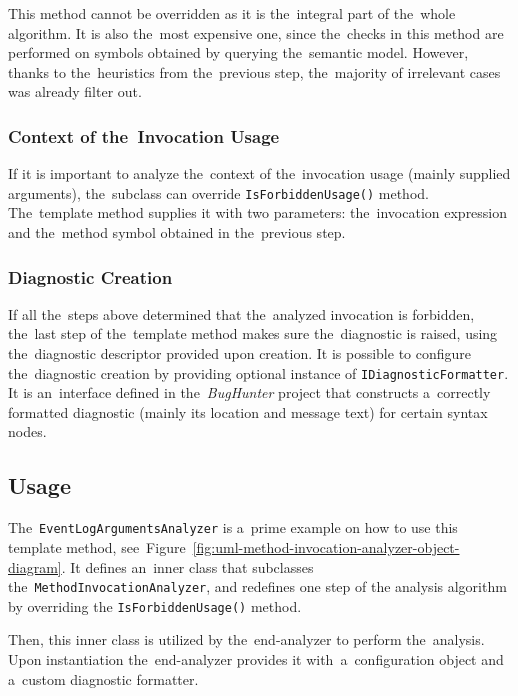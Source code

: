 \documentclass[
  digital, %
  table,   %
  lof,     %
  lot,     %
  oneside,
]{fithesis3}
\begin{document}
This method cannot be overridden as it is the~integral part of the~whole algorithm. It is also the~most expensive one, since the~checks in this method are performed on symbols obtained by querying the~semantic model. However, thanks to the~heuristics from the~previous step, the~majority of irrelevant cases was already filter out.

\subsubsection{\textbf{Context of the~Invocation Usage}}
If it is important to analyze the~context of the~invocation usage (mainly supplied arguments), the~subclass can override \texttt{IsForbiddenUsage()} method. The~template method supplies it with two parameters: the~invocation expression and the~method symbol obtained in the~previous step.

\subsubsection{\textbf{Diagnostic Creation}}
If all the~steps above determined that the~analyzed invocation is forbidden, the~last step of the~template method makes sure the~diagnostic is raised, using the~diagnostic descriptor provided upon creation. It is possible to configure the~diagnostic creation by providing optional instance of \texttt{IDiagnosticFormatter}. It is an~interface defined in the~\textit{BugHunter} project that constructs a~correctly formatted diagnostic (mainly its location and message text) for certain syntax nodes.

\subsection{Usage}
\label{sec:method-invocation-analyzer-usage}
The~\texttt{EventLogArgumentsAnalyzer} is a~prime example on how to use this template method, see~Figure~\ref{fig:uml-method-invocation-analyzer-object-diagram}. It defines an~inner class that subclasses the~\texttt{MethodInvocationAnalyzer}, and redefines one step of the analysis algorithm by overriding the  \texttt{IsForbiddenUsage()} method.

Then, this inner class is utilized by the~end-analyzer to perform the~analysis. Upon instantiation the~end-analyzer provides it with~a~configuration object and a~custom diagnostic formatter. 
\end{document}
